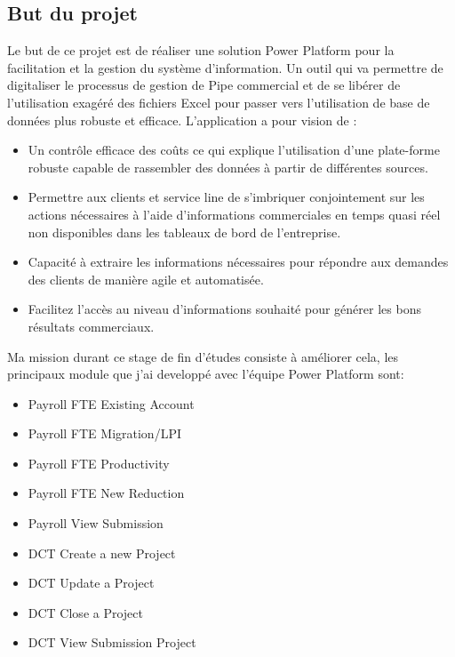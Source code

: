 \subsection{But du projet}

Le but de ce projet est de réaliser une solution Power Platform pour la facilitation et la gestion du système d’information. Un outil qui va permettre de digitaliser le processus de gestion de Pipe commercial et de se libérer de l’utilisation exagéré des fichiers Excel pour passer vers l’utilisation de base de données plus robuste et efficace. L’application a pour vision de :  
\\

\begin{itemize}
  \item Un contrôle efficace des coûts ce qui explique l'utilisation d'une plate-forme robuste capable de rassembler des données à partir de différentes sources.
  \item Permettre aux clients et service line de s'imbriquer conjointement sur les actions nécessaires à l'aide d'informations commerciales en temps quasi réel non disponibles dans les tableaux de bord de l'entreprise.
  \item Capacité à extraire les informations nécessaires pour répondre aux demandes des clients de manière agile et automatisée.
  \item Facilitez l'accès au niveau d'informations souhaité pour générer les bons résultats commerciaux.
\end{itemize}

Ma mission durant ce stage de fin d’études consiste à améliorer cela, les principaux module que j'ai developpé avec l'équipe Power Platform sont:
\\
\begin{itemize}
  \item Payroll FTE Existing Account
  \item Payroll FTE Migration/LPI
  \item Payroll FTE Productivity
  \item Payroll FTE New Reduction
  \item Payroll View Submission
  \item DCT Create a new Project
  \item DCT Update a Project
  \item DCT Close  a  Project
  \item DCT View Submission Project
\end{itemize}

